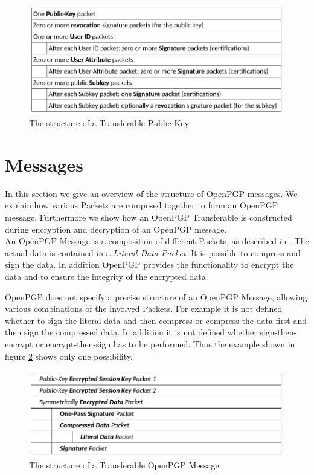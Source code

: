 \begin{figure}[h]
	\centering
	\includegraphics[width=1\linewidth]{figures/transferable-key.png}
	\caption{The structure of a Transferable Public Key}
	\label{fig:transferable-key}
\end{figure}

\section{Messages}
\label{section:messageformat:messages}

In this section we give an overview of the structure of OpenPGP messages. We explain how various Packets are composed together to form an OpenPGP message. Furthermore we show how an OpenPGP Transferable is constructed during encryption and decryption of an OpenPGP message. \\

An OpenPGP Message is a composition of different Packets, as described in \cite[section 11.3]{RFC4880}. The actual data is contained in a \textit{Literal Data Packet}. It is possible to compress and sign the data. In addition OpenPGP provides the functionality to encrypt the data and to ensure the integrity of the encrypted data.

OpenPGP does not specify a precise structure of an OpenPGP Message, allowing various combinations of the involved Packets. For example it is not defined whether to sign the literal data and then compress or compress the data first and then sign the compressed data. In addition it is not defined whether sign-then-encrypt or encrypt-then-sign has to be performed. Thus the example shown in figure \ref{fig:transferable-msg} shows only one possibility.

\begin{figure}[h!]
	\centering
	\includegraphics[width=1\linewidth]{figures/transferable-msg.png}
	\caption{The structure of a Transferable OpenPGP Message}
	\label{fig:transferable-msg}
\end{figure}




